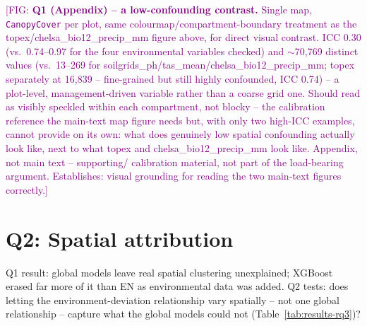 \documentclass[logo,msc,ai]{infthesis}           %
\newcommand{\fig}[1]{\textcolor{purple}{[FIG: #1]}}
\begin{document}
\fig{\textbf{Q1 (Appendix) -- a low-confounding contrast.} Single map,
\texttt{CanopyCover} per plot, same colourmap/compartment-boundary treatment as the
topex/chelsa\_bio12\_precip\_mm figure above, for direct visual contrast. ICC 0.30
(vs.\ 0.74--0.97 for the four environmental variables checked) and $\sim$70,769
distinct values (vs.\ 13--269 for soilgrids\_ph/tas\_mean/chelsa\_bio12\_precip\_mm;
topex separately at 16{,}839 -- fine-grained but still highly confounded, ICC 0.74) --
a plot-level, management-driven variable rather than a coarse grid one. Should read as visibly speckled within each compartment,
not blocky -- the calibration reference the main-text map figure needs but, with
only two high-ICC examples, cannot provide on its own: what does genuinely low
spatial confounding actually look like, next to what topex and
chelsa\_bio12\_precip\_mm look like. Appendix, not main text -- supporting/
calibration material, not part of the load-bearing argument. Establishes: visual
grounding for reading the two main-text figures correctly.}

\section{Q2: Spatial attribution}
\label{sec:results-rq3}

Q1 result: global models leave real spatial clustering unexplained; XGBoost erased
far more of it than EN as environmental data was added.
Q2 tests: does letting the environment-deviation relationship vary spatially --
not one global relationship -- capture what the global models could not
(Table~\ref{tab:results-rq3})?
\end{document}
